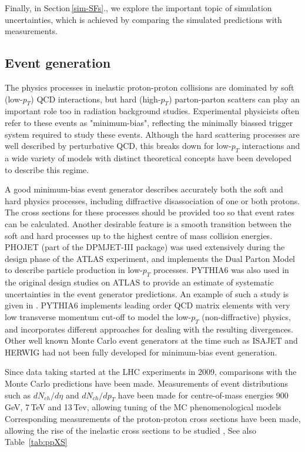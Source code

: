 Finally, in Section\,\ref{sim-SFs}., we explore the important topic of simulation uncertainties, which is achieved by comparing the simulated predictions with measurements.

\subsection{Event generation}
\label{ev-gen}
The physics processes in inelastic proton-proton collisions are dominated by soft (low-$p_{T}$) QCD interactions, but hard (high-$p_{T}$) parton-parton scatters can play an important role too in radiation background studies.
Experimental physicists often refer to these events as "minimum-bias", reflecting the minimally biassed trigger system required to study these events. 
Although the hard scattering processes are well described by perturbative QCD, this breaks down for low-$p_{T}$ interactions and a wide variety of models with distinct theoretical concepts have been developed to describe this regime. 

A good minimum-bias event generator describes accurately both the soft and hard physics processes, including diffractive disassociation of one or both protons.
The cross sections for these processes should be provided too so that event rates can be calculated. 
Another desirable feature is a smooth transition between the soft and hard processes up to the highest centre of mass collision energies. 
PHOJET \cite{PHOJET} (part of the DPMJET-III package) was used extensively during the design phase of the ATLAS experiment, and implements the Dual Parton Model \cite{DPM} to describe particle production in low-$p_{T}$ processes. 
PYTHIA6 \cite{PYTHIA6} was also used in the original design studies on ATLAS to provide an estimate of systematic uncertainties in the event generator predictions. An example of such a study is given in \cite{Pyth6PhojetComp}. PYTHIA6 implements leading order QCD matrix elements with very low transverse momentum cut-off to model the low-$p_{T}$ (non-diffractive) physics, and incorporates different approaches for dealing with the resulting divergences. Other well known Monte Carlo event generators at the time such as ISAJET and HERWIG had not been fully developed for minimum-bias event generation.

Since data taking started at the LHC experiments in 2009, comparisons with the Monte Carlo predictions have been made. 
Measurements of event distributions such as $dN_{ch}/d\eta$ and $dN_{ch}/d p_{T}$ have been made for centre-of-mass energies 900\,GeV, 7\,TeV and 13\,Tev, allowing tuning of the MC phenomenological models \cite{minbiasPapers}
Corresponding measurements of the proton-proton cross sections have been made, allowing the rise of the inelastic cross sections to be studied \cite{ppCrossSection}, See also Table~\ref{tab:ppXS} 

